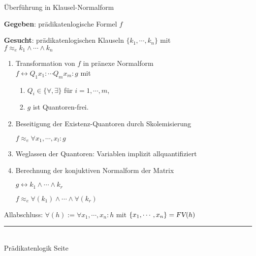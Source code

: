 \documentclass{slides}
\newcommand{\myrule}{\rule{20cm}{1mm}\\ }
\newcommand{\FV}{\textsl{FV}}
\newcounter{mypage}
\begin{document}
\begin{slide}{}
\normalsize
\begin{center}
Überführung in Klausel-Normalform
\end{center}
\vspace{0.5cm}

\footnotesize
\textbf{Gegeben}: prädikatenlogische Formel $f$

\textbf{Gesucht}: prädikatenlogischen Klauseln $\{k_1,\cdots,k_n\}$ mit \\[0.1cm]
\hspace*{1.3cm} $f \approx_e k_1 \wedge \cdots \wedge k_n$
\begin{enumerate}
\item Transformation von $f$ in pränexe Normalform 
      \\[0.3cm]
      \hspace*{1.3cm}
      $f \leftrightarrow Q_1 x_1: \cdots Q_m x_m: g$ \quad mit
      \begin{enumerate}
      \item $Q_i \in \{\forall, \exists\}$ für $i=1,\cdots,m$,
      \item $g$ ist Quantoren-frei.
      \end{enumerate}
\item Beseitigung der Existenz-Quantoren durch Skolemisierung

       $f \approx_e \forall x_1, \cdots, x_l: g$
\item Weglassen der Quantoren: Variablen implizit allquantifiziert
\item Berechnung der konjuktiven Normalform der Matrix

      \hspace*{1.3cm} $g \leftrightarrow k_1 \wedge \cdots \wedge k_r$

      $f \approx_e \forall(k_1) \wedge \cdots \wedge \forall(k_r)$
\end{enumerate}
Allabschluss: $\forall(h) := \forall x_1, \cdots, x_n:h$ mit $\{x_1,\cdots,x_n\} = \FV(h)$


\vspace*{\fill}
\tiny \addtocounter{mypage}{1}
\myrule
Prädikatenlogik   \hspace*{\fill} Seite 
\end{slide}

\end{document}
